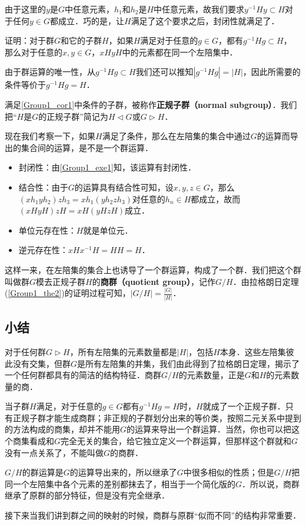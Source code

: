 由于这里的$y$是$G$中任意元素，$h_1$和$h_2$是$H$中任意元素，故我们要求$y^{-1}Hy\subset H$对于任何$y\in G$都成立．巧的是，让$H$满足了这个要求之后，封闭性就满足了．

\begin{exercise}{}\label{Group1_exe1}
证明：对于群$G$和它的子群$H$，如果$H$满足对于任意的$g\in G$，都有$g^{-1}Hg\subset H$， 那么对于任意的$x, y\in G$，$xHyH$中的元素都在同一个左陪集中．
\end{exercise}

\begin{corollary}{}\label{Group1_cor1}
由于群运算的唯一性，从$g^{-1}Hg\subset H$我们还可以推知$|g^{-1}Hg|=|H|$，因此所需要的条件等价于$g^{-1}Hg=H$．
\end{corollary}

满足\autoref{Group1_cor1}中条件的子群，被称作\textbf{正规子群（normal subgroup）}．我们把“$H$是$G$的正规子群”简记为$H\triangleleft G$或$G\triangleright H$．

现在我们考察一下，如果$H$满足了条件，那么在左陪集的集合中通过$G$的运算而导出的集合间的运算，是不是一个群运算．
\begin{itemize}
\item 封闭性：由\autoref{Group1_exe1}知，该运算有封闭性．
\item 结合性：由于$G$的运算具有结合性可知，设$x, y, z\in G$，那么$(xh_1yh_2)zh_3=xh_1(yh_2zh_3)$对任意的$h_n\in H$都成立，故而$(xHyH)zH=xH(yHzH)$成立．
\item 单位元存在性：$H$就是单位元．
\item 逆元存在性：$xHx^{-1}H=HH=H$．
\end{itemize}

这样一来，在左陪集的集合上也诱导了一个群运算，构成了一个群．我们把这个群叫做群$G$模去正规子群$H$的\textbf{商群（quotient group）}，记作$G/H$．由拉格朗日定理(\autoref{Group1_the2})的证明过程可知，$|G/H|=\frac{|G|}{|H|}$．

\subsection{小结}

对于任何群$G\triangleright H$，所有左陪集的元素数量都是$|H|$，包括$H$本身．这些左陪集彼此没有交集，但群$G$是所有左陪集的并集，我们由此得到了拉格朗日定理，揭示了一个任何群都具有的简洁的结构特征．商群$G/H$的元素数量，正是$G$和$H$的元素数量的商．

当子群$H$满足，对于任意的$g\in G$都有$g^{-1}Hg=H$时，$H$就成了一个正规子群．只有正规子群才能生成商群；非正规的子群划分出来的等价类，按照二元关系中提到的方法构成的商集，却并不能用$G$的运算来导出一个群运算．当然，你也可以把这个商集看成和$G$完全无关的集合，给它独立定义一个群运算，但那样这个群就和$G$没有一点关系了，不能叫做$G$的商群．

$G/H$的群运算是$G$的运算导出来的，所以继承了$G$中很多相似的性质；但是$G/H$把同一个左陪集中各个元素的差别都抹去了，相当于一个简化版的$G$．所以说，商群继承了原群的部分特征，但是没有完全继承．

接下来当我们讲到群之间的映射的时候，商群与原群“似而不同”的结构非常重要．




